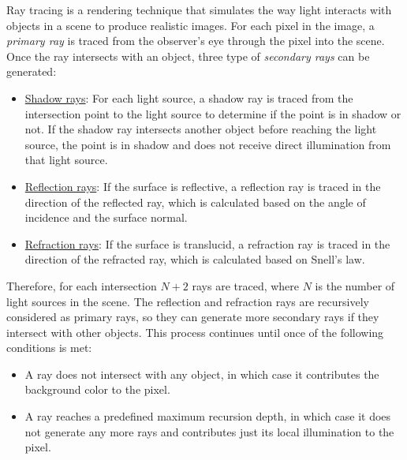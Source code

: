 Ray tracing is a rendering technique that simulates the way light interacts with objects in a scene to produce realistic images. For each pixel in the image, a \emph{primary ray} is traced from the observer's eye through the pixel into the scene. Once the ray intersects with an object, three type of \emph{secondary rays} can be generated:
\begin{itemize}
    \item \ul{Shadow rays}: For each light source, a shadow ray is traced from the intersection point to the light source to determine if the point is in shadow or not. If the shadow ray intersects another object before reaching the light source, the point is in shadow and does not receive direct illumination from that light source.
    \item \ul{Reflection rays}: If the surface is reflective, a reflection ray is traced in the direction of the reflected ray, which is calculated based on the angle of incidence and the surface normal.
    \item \ul{Refraction rays}: If the surface is translucid, a refraction ray is traced in the direction of the refracted ray, which is calculated based on Snell's law.
\end{itemize}

Therefore, for each intersection $N+2$ rays are traced, where $N$ is the number of light sources in the scene. The reflection and refraction rays are recursively considered as primary rays, so they can generate more secondary rays if they intersect with other objects. This process continues until once of the following conditions is met:
\begin{itemize}
    \item A ray does not intersect with any object, in which case it contributes the background color to the pixel.
    \item A ray reaches a predefined maximum recursion depth, in which case it does not generate any more rays and contributes just its local illumination to the pixel.
\end{itemize}


